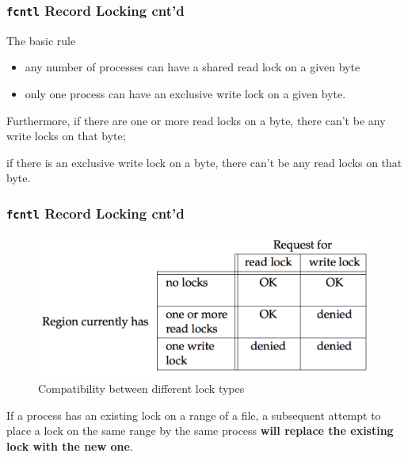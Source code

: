 \documentclass[newPxFont,sthlmFooter,nooffset]{beamer}
\begin{document}
\begin{frame}[t]
  \frametitle{\texttt{fcntl} Record Locking cnt'd}
The basic rule
\begin{itemize}
\item any number of processes can have a shared read lock on a given
  byte
\item only one process can have an exclusive write lock on a
  given byte.
\end{itemize}

\bigskip
Furthermore, if there are one or more read locks on a byte, there can’t be any write locks on that byte; 

\bigskip
if there is an exclusive write lock on a byte, there can’t be any read locks on that byte.  
\end{frame}

\begin{frame}[t]
  \frametitle{\texttt{fcntl} Record Locking cnt'd}

  \begin{figure}[h]
   \centering
    \includegraphics[width=0.7\linewidth]{figures/fig14_3-compatibility.png}
    \caption{Compatibility between different lock types}
  \end{figure}  

\bigskip

If a process has an existing lock on a range of a file, a subsequent attempt to place a lock on the same range by the same process \textbf{will replace the existing lock with the new one}. 
\end{frame}
\end{document}
